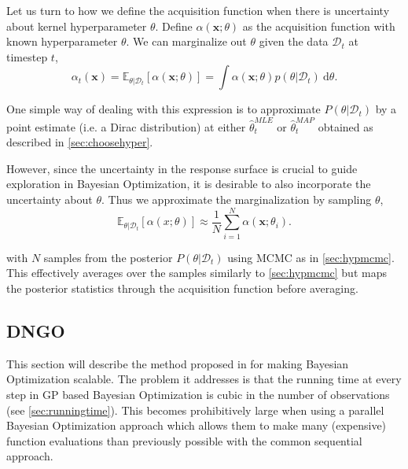 \documentclass[conference,compsoc]{IEEEtran}
\theoremstyle{definition}
\begin{document}
        Let us turn to how we define the acquisition function when there is uncertainty about kernel hyperparameter $\theta$.
        Define $\alpha(\bm{x};\theta)$ as the acquisition function with known hyperparameter $\theta$.
        We can marginalize out $\theta$ given the data $\mathcal{D}_t$ at timestep $t$,
            \begin{equation}
            \alpha_t(\bm{x}) = \mathbb{E}_{\theta|\mathcal{D}_t}[\alpha(\bm{x};\theta)]
                        = \int \alpha(\bm{x};\theta)p(\theta|\mathcal{D}_t) \ \mathrm{d}\theta.
            \end{equation}

        One simple way of dealing with this expression is to approximate $P(\theta|\mathcal{D}_t)$ by a point estimate (i.e. a Dirac distribution) at either $\hat{\theta}_t^{MLE}$ or $\hat{\theta}_t^{MAP}$ obtained as described in \cref{sec:choosehyper}.

        However, since the uncertainty in the response surface is crucial to guide exploration in Bayesian Optimization, it is desirable to also incorporate the uncertainty about $\theta$.
        Thus we approximate the marginalization by sampling $\theta$,
            \begin{equation}
              \mathbb{E}_{\theta|\mathcal{D}_t}[\alpha(x;\theta)] \approx \frac{1}{N} \sum_{i=1}^{N} \alpha(\bm{x};\theta_i).
            \end{equation}
            
        \noindent with $N$ samples from the posterior $P(\theta|\mathcal{D}_t)$ using MCMC as in \cref{sec:hypmcmc}.
        This effectively averages over the samples similarly to \cref{sec:hypmcmc} but maps the posterior statistics through the acquisition function before averaging.


    \subsection{DNGO}\label{sec:dngo}

        This section will describe the method proposed in \parencite{snoek_scalable_2015} for making Bayesian Optimization scalable.
        The problem it addresses is that the running time at every step in GP based Bayesian Optimization is cubic in the number of observations (see \cref{sec:runningtime}).
        This becomes prohibitively large when using a parallel Bayesian Optimization approach \parencite{snoek_practical_2012} which allows them to make many (expensive) function evaluations than previously possible with the common sequential approach.
\end{document}
